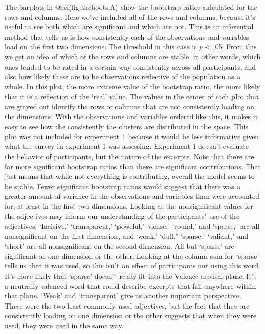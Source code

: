 \documentclass[
  english,
  man,floatsintext]{apa6}
\begin{document}
The barplots in @ref(fig:theboots.A) show the bootstrap ratios calculated for the rows and columns. Here we've included all of the rows and columns, because it's useful to see both which are significant and which are not. This is an inferential method that tells us is how consistently each of the observations and variables load on the first two dimensions. The threshold in this case is \emph{p} \textless{} .05. From this we get an idea of which of the rows and columns are stable, in other words, which ones tended to be rated in a certain way consistently across all participants, and also how likely these are to be observations reflective of the population as a whole. In this plot, the more extreme value of the bootstrap ratio, the more likely that it is a reflection of the `real' value. The values in the center of each plot that are grayed out identify the rows or columns that are not consistently loading on the dimensions. With the observations and variables ordered like this, it makes it easy to see how the consistently the clusters are distributed in the space. This plot was not included for experiment 1 because it would be less informative given what the survey in experiment 1 was assessing. Experiment 1 doesn't evaluate the behavior of participants, but the nature of the excerpts.
Note that there are far more significant bootstrap ratios than there are significant contributions. That just means that while not everything is contributing, overall the model seems to be stable. Fewer significant bootstrap ratios would suggest that there was a greater amount of variance in the observations and variables than were accounted for, at least in the first two dimensions. Looking at the nonsignificant values for the adjectives may inform our understanding of the participants' use of the adjectives. `Incisive,' `transparent,' `poweful,' `dense,' `round,' and `sparse,' are all nonsignificant on the first dimension, and `weak,' `dull,' `sparse,' `valiant,' and `short' are all nonsignificant on the second dimension. All but `sparse' are significant on one dimension or the other. Looking at the column sum for `sparse' tells us that it was used, so this isn't an effect of participants not using this word. It's more likely that `sparse' doesn't really fit into the Valence-arousal plane. It's a neutrally valenced word that could describe excerpts that fall anywhere within that plane. `Weak' and `transparent' give us another important perspective. These were the two least commonly used adjectives, but the fact that they are consistently loading on one dimension or the other suggests that when they were used, they were used in the same way.
\end{document}
